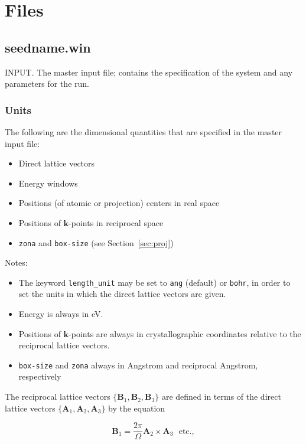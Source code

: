 \chapter{Files}


\section{seedname.win}
INPUT. The master input file; contains the specification of the system
and any parameters for the run. 

\subsection{Units}

The following are the dimensional quantities that are
specified in the master input file:

\begin{itemize}
\item Direct lattice vectors
\item Energy windows
\item Positions (of atomic or projection) centers in real space
\item Positions of $\mathbf{k}$-points in reciprocal space
\item \verb#zona# and \verb#box-size# (see Section~\ref{sec:proj})
\end{itemize}

Notes:

\begin{itemize}
\item The keyword \verb#length_unit# may be set to \verb#ang#
  (default) or \verb#bohr#, in order to set the units in which the
  direct  lattice vectors are given. 
\item Energy is always in eV.
\item Positions of $\mathbf{k}$-points are always in crystallographic
  coordinates
relative to the reciprocal lattice vectors.
\item \verb#box-size# and \verb#zona# always in Angstrom and
  reciprocal Angstrom, respectively
\end{itemize}

The reciprocal lattice vectors
$\{\mathbf{B}_{1},\mathbf{B}_{2},\mathbf{B}_{3}\}$ are defined in
terms
of the direct lattice vectors
$\{\mathbf{A}_{1},\mathbf{A}_{2},\mathbf{A}_{3}\}$ by the equation

\begin{equation}
\mathbf{B}_{1} = \frac{2\pi}{\Omega}\mathbf{A}_{2}\times\mathbf{A}_{3}
\ \ \ \mathrm{etc.},
\end{equation}

